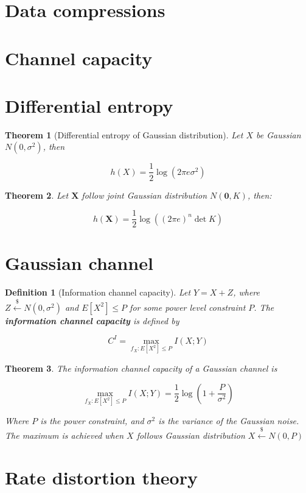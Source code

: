 \documentclass{article}
\newcommand{\leftsample}{\overset{{\scriptscriptstyle\$}}{\leftarrow}}
\newtheorem{definition}{Definition}[section]
\newtheorem{theorem}{Theorem}[section]
\begin{document}
\section{Data compressions}

\section{Channel capacity}

\section{Differential entropy}
\begin{theorem}[Differential entropy of Gaussian distribution]
    Let $X$ be Gaussian $N(0, \sigma^2)$, then

    $$
    h(X) = \frac{1}{2}\log{(2\pi e \sigma^2)}
    $$
\end{theorem}

\begin{theorem}
    Let $\mathbf{X}$ follow joint Gaussian distribution $N(\mathbf{0}, K)$, then:

    \begin{equation*}
        h(\mathbf{X}) = \frac{1}{2}\log ((2\pi e)^n \det{K})
    \end{equation*}
\end{theorem}

\section{Gaussian channel}
\begin{definition}[Information channel capacity]
    Let $Y = X + Z$, where $Z \leftsample N(0, \sigma^2)$ and $E[X^2] \leq P$ for some power level constraint $P$. The \textbf{information channel capacity} is defined by

    $$
    C^I = \max_{f_X : E[X^2] \leq P} I(X; Y)
    $$
\end{definition}

\begin{theorem}
    The information channel capacity of a Gaussian channel is

    \begin{equation}
        \max_{f_X: E[X^2] \leq P} I(X; Y) = \frac{1}{2}\log{(1 + \frac{P}{\sigma^2})}
    \end{equation}

    Where $P$ is the power constraint, and $\sigma^2$ is the variance of the Gaussian noise. The maximum is achieved when $X$ follows Gaussian distribution $X \leftsample N(0, P)$
\end{theorem}

\section{Rate distortion theory}
\end{document}
